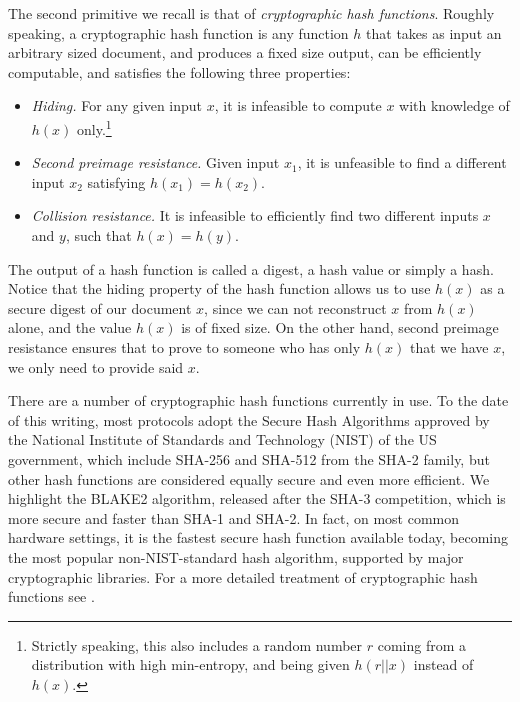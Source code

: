 The second primitive we recall is that of {\em cryptographic hash functions}. Roughly speaking, a cryptographic hash function is any function $h$ that takes as input an arbitrary sized document, and produces a fixed size output, can be efficiently computable, and satisfies the following three properties:
\begin{itemize}
\item {\em Hiding.} For any given input $x$, it is infeasible to compute $x$ with knowledge of $h(x)$ only.\footnote{Strictly speaking, this also includes a random number $r$ coming from a distribution with high min-entropy, and being given $h(r||x)$ instead of $h(x)$.}
\item {\em Second preimage resistance.} Given input $x_1$, it is unfeasible to find a different input $x_2$ satisfying $h(x_1)=h(x_2)$.
\item {\em Collision resistance.} It is infeasible to efficiently find two different inputs $x$ and $y$, such that $h(x)=h(y)$.
\end{itemize}
The output of a hash function is called a digest, a hash value or simply a hash. Notice that the hiding property of the hash function allows us to use $h(x)$ as a secure digest of our document $x$, since we can not reconstruct $x$ from $h(x)$ alone, and the value $h(x)$ is of fixed size.
On the other hand, second preimage resistance ensures that to prove to someone who has only $h(x)$ that we have $x$, we only need to provide said $x$. 

There are a number of cryptographic hash functions currently in use. To the date of this writing, most protocols adopt the Secure Hash Algorithms\cite{sha_standard} approved by the National Institute of Standards and Technology (NIST) of the US government, which include SHA-256 and SHA-512 from the SHA-2 family, but other hash functions are considered equally secure and even more efficient. We highlight the BLAKE2 algorithm, released after the SHA-3 competition, which is more secure and faster than SHA-1 and SHA-2. In fact, on most common hardware settings, it is the fastest secure hash function available today, becoming the most popular non-NIST-standard hash algorithm, supported by major cryptographic libraries. For a more detailed treatment of cryptographic hash functions see \cite{sha_standard,aumasson,sha3zoo,bitcoinbook}. %

